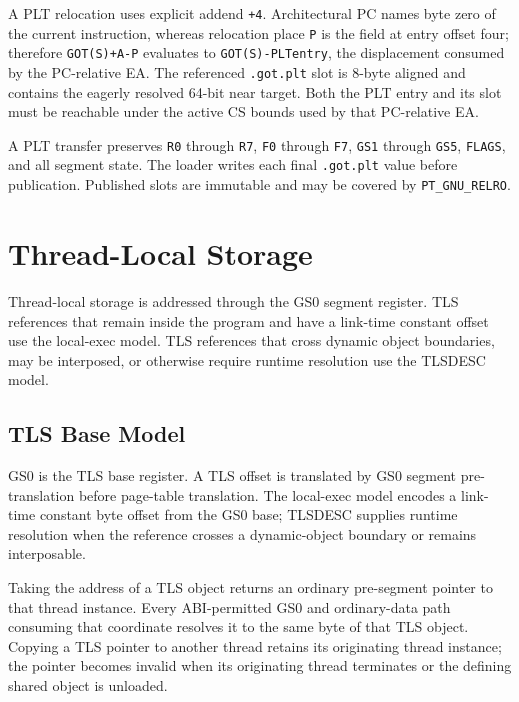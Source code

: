 \documentclass[10pt,twoside]{article}
\begin{document}
A PLT relocation uses explicit addend \texttt{+4}. Architectural PC names byte zero of the current instruction,
whereas relocation place \texttt{P} is the field at entry offset four; therefore
\texttt{GOT(S)+A-P} evaluates to \texttt{GOT(S)-PLTentry}, the displacement consumed by the PC-relative EA. The
referenced \texttt{.got.plt} slot is 8-byte aligned and contains the eagerly resolved 64-bit near target. Both the
PLT entry and its slot must be reachable under the active CS bounds used by that PC-relative EA.

A PLT transfer preserves \texttt{R0} through \texttt{R7}, \texttt{F0} through
\texttt{F7}, \texttt{GS1} through \texttt{GS5}, \texttt{FLAGS}, and all
segment state. The loader writes each final \texttt{.got.plt} value before
publication. Published slots are immutable and may be covered by
\texttt{PT\_GNU\_RELRO}.
\clearpage
\section{Thread-Local Storage}\label{page:thread-local-storage}
Thread-local storage is addressed through the GS0 segment register. TLS references that remain inside the program and have a link-time constant offset use the local-exec model. TLS references that cross dynamic object boundaries, may be interposed, or otherwise require runtime resolution use the TLSDESC model.
\subsection{TLS Base Model}
GS0 is the TLS base register. A TLS offset is translated by GS0 segment
pre-translation before page-table translation. The local-exec model encodes a
link-time constant byte offset from the GS0 base; TLSDESC supplies runtime
resolution when the reference crosses a dynamic-object boundary or remains
interposable.



Taking the address of a TLS object returns an ordinary pre-segment pointer to
that thread instance. Every ABI-permitted GS0 and ordinary-data path consuming
that coordinate resolves it to the same byte of that TLS object. Copying a TLS pointer to
another thread retains its originating thread instance; the pointer becomes invalid when its
originating thread terminates or the defining shared object is unloaded.
\end{document}
